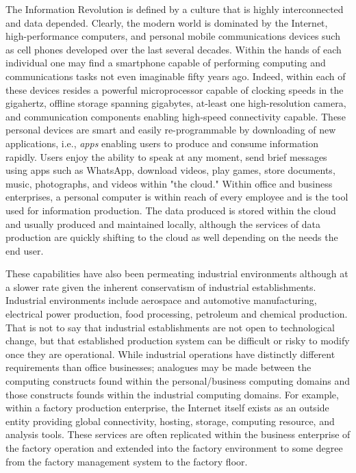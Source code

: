 The Information Revolution is defined by a culture that is highly interconnected and data depended.  Clearly, the modern world is dominated by the Internet, high-performance computers, and personal mobile communications devices such as cell phones developed over the last several decades. Within the hands of each individual one may find a smartphone capable of performing computing and communications tasks not even imaginable fifty years ago.  Indeed, within each of these devices resides a powerful microprocessor capable of clocking speeds in the gigahertz, offline storage spanning gigabytes, at-least one high-resolution camera, and communication components enabling high-speed connectivity capable.  These personal devices are smart and easily re-programmable by downloading of new applications, i.e., \textit{apps} enabling users to produce and consume information rapidly.  Users enjoy the ability to speak at any moment, send brief messages using apps such as WhatsApp\texttrademark, download videos, play games, store documents, music, photographs, and videos within "the cloud."  Within office and business enterprises, a personal computer is within reach of every employee and is the tool used for information production.  The data produced is stored within the cloud and usually produced and maintained locally, although the services of data production are quickly shifting to the cloud as well depending on the needs the end user.

These capabilities have also been permeating industrial environments although at a slower rate given the inherent conservatism of industrial establishments.  Industrial environments include aerospace and automotive manufacturing, electrical power production, food processing, petroleum and chemical production.  That is not to say that industrial establishments are not open to technological change, but that established production system can be difficult or risky to modify once they are operational.  While industrial operations have distinctly different requirements than office businesses; analogues may be made between the computing constructs found within the personal/business computing domains and those constructs founds within the industrial computing domains.  For example, within a factory production enterprise, the Internet itself exists as an outside entity providing global connectivity, hosting, storage, computing resource, and analysis tools.  These services are often replicated within the business enterprise of the factory operation and extended into the factory environment to some degree from the factory management system to the factory floor.  

